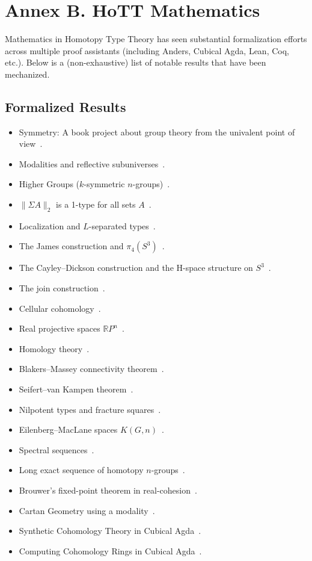 \documentclass[a4paper,UKenglish,cleveref, autoref, thm-restate]{lipics-v2021}
\begin{document}
\newpage
\section{Annex B. HoTT Mathematics}
\label{sec:hott-applications}

Mathematics in Homotopy Type Theory has seen substantial formalization efforts across multiple proof assistants (including Anders, Cubical Agda, Lean, Coq, etc.). Below is a (non-exhaustive) list of notable results that have been mechanized.

\subsection{Formalized Results}

\begin{itemize}
\item Symmetry: A book project about group theory from the univalent point of view~\cite{SymmetryBook}.
\item Modalities and reflective subuniverses~\cite{RijkeModalities}.
\item Higher Groups ($k$-symmetric $n$-groups)~\cite{BuchholtzHigherGroups}.
\item $\lVert \Sigma A \rVert_2$ is a 1-type for all sets $A$~\cite{KrausFreeHigherGroups}.
\item Localization and $L$-separated types~\cite{ChristensenLocalization}.
\item The James construction and $\pi_4(S^3)$~\cite{BrunerieJames}.
\item The Cayley--Dickson construction and the H-space structure on $S^3$~\cite{BuchholtzCayleyDickson}.
\item The join construction~\cite{RijkeJoin}.
\item Cellular cohomology~\cite{BuchholtzCellular}.
\item Real projective spaces $\mathbb{R}P^n$~\cite{BuchholtzRPn}.
\item Homology theory~\cite{GrahamSyntheticHomology}.
\item Blakers--Massey connectivity theorem~\cite{FavoniaBlakersMassey}.
\item Seifert--van Kampen theorem~\cite{FavoniaSeifertVanKampen}.
\item Nilpotent types and fracture squares~\cite{ScoccolaNilpotent}.
\item Eilenberg--MacLane spaces $K(G,n)$~\cite{LicataEilenbergMacLane}.
\item Spectral sequences~\cite{vanDoornSpectral}.
\item Long exact sequence of homotopy $n$-groups~\cite{BuchholtzLongExact}.
\item Brouwer’s fixed-point theorem in real-cohesion~\cite{ShulmanBrouwer}.
\item Cartan Geometry using a modality~\cite{CherubiniCartan}.
\item Synthetic Cohomology Theory in Cubical Agda~\cite{BrunerieSyntheticCohomology}.
\item Computing Cohomology Rings in Cubical Agda~\cite{LamiauxCohomologyRings}.
\end{itemize}
\end{document}
